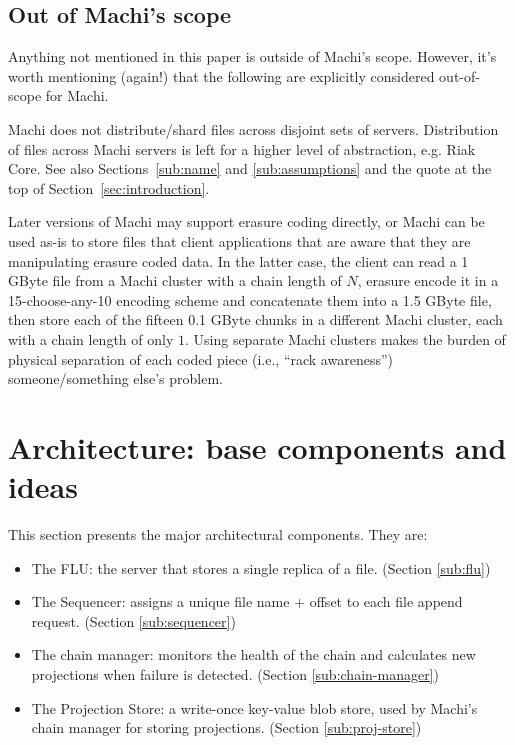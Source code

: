 \documentclass[preprint,10pt]{sigplanconf}
\begin{document}
\subsection{Out of Machi's scope}

Anything not mentioned in this paper is outside of Machi's scope.
However, it's worth mentioning (again!) that the following are explicitly
considered out-of-scope for Machi.

  Machi does not distribute/shard files across disjoint sets of servers.
  Distribution of files across Machi servers is left for a higher
  level of abstraction, e.g. Riak Core.  See also
  Sections~\ref{sub:name} and \ref{sub:assumptions} and the quote at
  the top of Section~\ref{sec:introduction}.

  Later versions of Machi may support erasure
  coding directly, or Machi can be used as-is to store files that
  client applications that are aware that they are manipulating
  erasure coded data.  In the latter case,
  the client can read a 1 GByte file from a Machi cluster with a chain
  length of $N$, erasure encode it in a
  15-choose-any-10 encoding scheme and concatenate them into a 1.5 GByte file,
  then store each of the fifteen
  0.1 GByte chunks in a different Machi cluster, each with a chain
  length of only $1$.  Using separate Machi clusters makes the
  burden of physical separation of each coded piece (i.e., ``rack
  awareness'') someone/something else's problem.

\section{Architecture: base components and ideas}

This section presents the major architectural components.  They are:

\begin{itemize}
\item The FLU: the server that stores a single replica of a file.
(Section \ref{sub:flu})
\item The Sequencer: assigns a unique file name + offset to each file
  append request.
(Section \ref{sub:sequencer})
\item The chain manager: monitors the health of the
  chain and calculates new projections when failure is detected.
(Section \ref{sub:chain-manager})
\item The Projection Store: a write-once key-value blob store, used by
  Machi's chain manager for storing projections.
(Section \ref{sub:proj-store})
\end{itemize}
\end{document}
